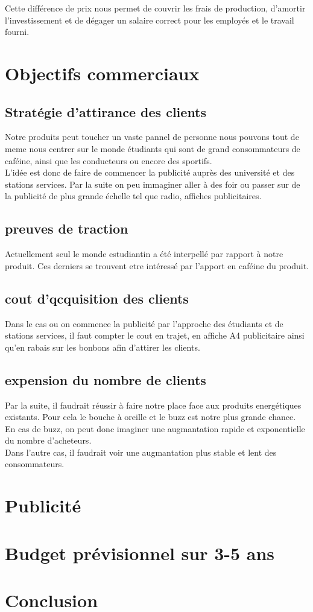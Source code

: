 \documentclass{article}
\begin{document}
Cette différence de prix nous permet de couvrir les frais de production, d'amortir l'investissement et de dégager un salaire correct pour les employés et le travail fourni.

\section{Objectifs commerciaux}
\subsection{Stratégie d'attirance des clients}
Notre produits peut toucher un vaste pannel de personne nous pouvons tout de meme
nous centrer sur le monde étudiants qui sont de grand consommateurs de caféine, ainsi que les conducteurs ou encore des sportifs.\\
L'idée est donc de faire de commencer la publicité auprès des université et des stations services. Par la suite on peu immaginer aller à des
foir ou passer sur de la publicité de plus grande échelle tel que radio, affiches publicitaires.
\subsection{preuves de traction}
Actuellement seul le monde estudiantin a été interpellé par rapport à notre produit. Ces derniers se trouvent etre intéressé par l'apport en caféine du produit.
\subsection{cout d'qcquisition des clients}
Dans le cas ou on commence la publicité par l'approche des étudiants et de stations services, il faut compter le cout en trajet, en affiche A4 publicitaire ainsi qu'en rabais sur les bonbons afin d'attirer les clients.

\subsection{expension du nombre de clients}
Par la suite, il faudrait réussir à faire notre place face aux produits energétiques existants. Pour cela le bouche à oreille et le buzz est notre plus grande chance.\\
En cas de buzz, on peut donc imaginer une augmantation rapide et exponentielle du nombre d'acheteurs.\\
Dans l'autre cas, il faudrait voir une augmantation plus stable et lent des consommateurs.

\section{Publicité}

\section{Budget prévisionnel sur 3-5 ans}

\section{Conclusion}



\end{document}
